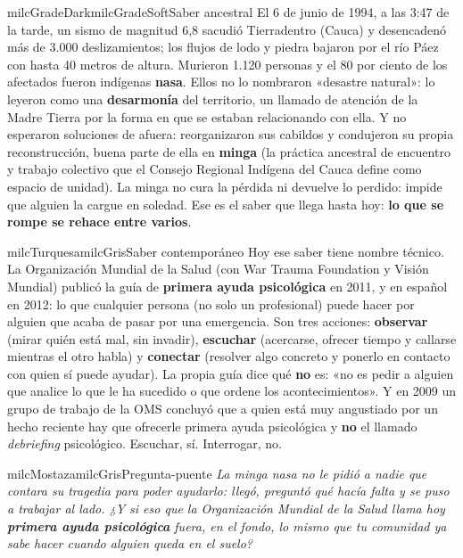 \documentclass[11pt,letterpaper]{article}
\begin{document}
\begin{softbox}{milcGradeDark}{milcGradeSoft}{Saber ancestral}
El 6 de junio de 1994, a las 3:47 de la tarde, un sismo de magnitud 6,8 sacudió Tierradentro (Cauca) y desencadenó más de 3.000 deslizamientos; los flujos de lodo y piedra bajaron por el río Páez con hasta 40 metros de altura. Murieron 1.120 personas y el 80 por ciento de los afectados fueron indígenas \textbf{nasa}. Ellos no lo nombraron «desastre natural»: lo leyeron como una \textbf{desarmonía} del territorio, un llamado de atención de la Madre Tierra por la forma en que se estaban relacionando con ella. Y no esperaron soluciones de afuera: reorganizaron sus cabildos y condujeron su propia reconstrucción, buena parte de ella en \textbf{minga} (la práctica ancestral de encuentro y trabajo colectivo que el Consejo Regional Indígena del Cauca define como espacio de unidad). La minga no cura la pérdida ni devuelve lo perdido: impide que alguien la cargue en soledad. Ese es el saber que llega hasta hoy: \textbf{lo que se rompe se rehace entre varios}.
\end{softbox}

\begin{softbox}{milcTurquesa}{milcGris}{Saber contemporáneo}
Hoy ese saber tiene nombre técnico. La Organización Mundial de la Salud (con War Trauma Foundation y Visión Mundial) publicó la guía de \textbf{primera ayuda psicológica} en 2011, y en español en 2012: lo que cualquier persona (no solo un profesional) puede hacer por alguien que acaba de pasar por una emergencia. Son tres acciones: \textbf{observar} (mirar quién está mal, sin invadir), \textbf{escuchar} (acercarse, ofrecer tiempo y callarse mientras el otro habla) y \textbf{conectar} (resolver algo concreto y ponerlo en contacto con quien sí puede ayudar). La propia guía dice qué \textbf{no} es: «no es pedir a alguien que analice lo que le ha sucedido o que ordene los acontecimientos». Y en 2009 un grupo de trabajo de la OMS concluyó que a quien está muy angustiado por un hecho reciente hay que ofrecerle primera ayuda psicológica y \textbf{no} el llamado \emph{debriefing} psicológico. Escuchar, sí. Interrogar, no.
\end{softbox}

\begin{softbox}{milcMostaza}{milcGris}{Pregunta-puente}
\textit{La minga nasa no le pidió a nadie que contara su tragedia para poder ayudarlo: llegó, preguntó qué hacía falta y se puso a trabajar al lado. ¿Y si eso que la Organización Mundial de la Salud llama hoy \textbf{primera ayuda psicológica} fuera, en el fondo, lo mismo que tu comunidad ya sabe hacer cuando alguien queda en el suelo?}
\end{softbox}
\end{document}
